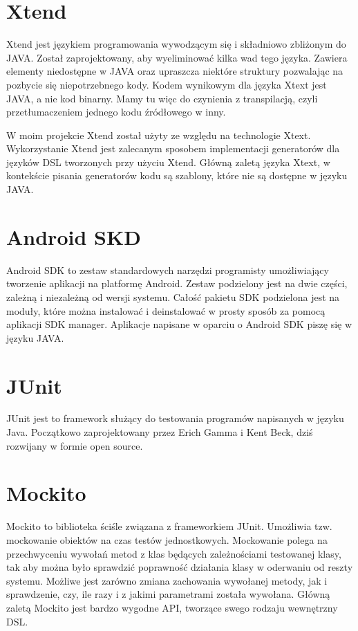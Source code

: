 \documentclass{xmgr}
\begin{document}
\section{Xtend}

Xtend \cite{Xtend:2017:Doc} jest językiem programowania wywodzącym się i składniowo zbliżonym do JAVA. Został zaprojektowany, aby wyeliminować kilka wad tego języka. Zawiera elementy niedostępne w JAVA oraz upraszcza niektóre struktury pozwalając na pozbycie się niepotrzebnego kody. Kodem wynikowym dla języka Xtext jest JAVA, a nie kod binarny. Mamy tu więc do czynienia z transpilacją, czyli przetłumaczeniem jednego kodu źródłowego w inny.

W moim projekcie Xtend został użyty ze względu na technologie Xtext. Wykorzystanie Xtend jest zalecanym sposobem implementacji generatorów dla języków DSL tworzonych przy użyciu Xtend. Główną zaletą języka Xtext, w kontekście pisania generatorów kodu są szablony, które nie są dostępne w języku JAVA.

\section{Android SKD}

Android SDK \cite{AndroidSDK:2017:Doc} to zestaw standardowych narzędzi programisty umożliwiający tworzenie aplikacji na platformę Android. Zestaw podzielony jest na dwie części, zależną i niezależną od wersji systemu. Całość pakietu SDK podzielona jest na moduły, które można instalować i deinstalować w prosty sposób za pomocą aplikacji SDK manager. Aplikacje napisane w oparciu o Android SDK piszę się w języku JAVA.

\section{JUnit}

JUnit \cite{JUnit:2017:Doc} jest to framework służący do testowania programów napisanych w języku Java. Początkowo zaprojektowany przez Erich Gamma i Kent Beck, dziś rozwijany w formie open source.

\section{Mockito}

Mockito \cite{Mockito:2017:Doc} to biblioteka ściśle związana z frameworkiem JUnit. Umożliwia tzw. mockowanie obiektów na czas testów jednostkowych. Mockowanie polega na przechwyceniu wywołań metod z klas będących zależnościami testowanej klasy, tak aby można było sprawdzić poprawność działania klasy w oderwaniu od reszty systemu. Możliwe jest zarówno zmiana zachowania wywołanej metody, jak i sprawdzenie, czy, ile razy i z jakimi parametrami została wywołana. Główną zaletą Mockito jest bardzo wygodne API, tworzące swego rodzaju wewnętrzny DSL.
 
\end{document}

